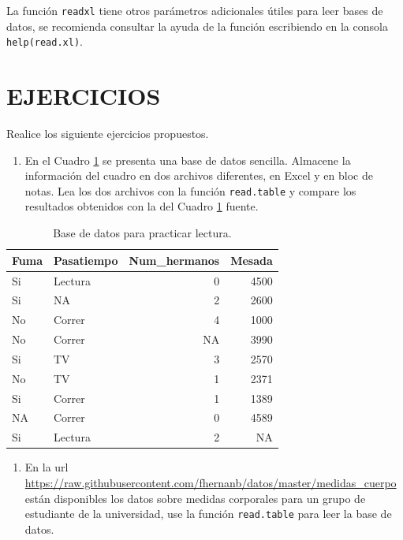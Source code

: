 \documentclass[10pt,]{krantz}
\providecommand{\tightlist}{%
  \setlength{\itemsep}{0pt}\setlength{\parskip}{0pt}}
\begin{document}
La función \texttt{readxl} tiene otros parámetros adicionales útiles
para leer bases de datos, se recomienda consultar la ayuda de la función
escribiendo en la consola \texttt{help(read.xl)}.

\section*{EJERCICIOS}\label{ejercicios-3}


Realice los siguiente ejercicios propuestos.

\begin{enumerate}
\def\labelenumi{\arabic{enumi}.}
\tightlist
\item
  En el Cuadro \ref{tab:toy} se presenta una base de datos sencilla.
  Almacene la información del cuadro en dos archivos diferentes, en
  Excel y en bloc de notas. Lea los dos archivos con la función
  \texttt{read.table} y compare los resultados obtenidos con la del
  Cuadro \ref{tab:toy} fuente.
\end{enumerate}

\begin{table}

\caption{\label{tab:toy}Base de datos para practicar lectura.}
\centering
\begin{tabular}[t]{llrr}
\toprule
Fuma & Pasatiempo & Num\_hermanos & Mesada\\
\midrule
Si & Lectura & 0 & 4500\\
Si & NA & 2 & 2600\\
No & Correr & 4 & 1000\\
No & Correr & NA & 3990\\
Si & TV & 3 & 2570\\
\addlinespace
No & TV & 1 & 2371\\
Si & Correr & 1 & 1389\\
NA & Correr & 0 & 4589\\
Si & Lectura & 2 & NA\\
\bottomrule
\end{tabular}
\end{table}

\begin{enumerate}
\def\labelenumi{\arabic{enumi}.}
\setcounter{enumi}{1}
\tightlist
\item
  En la url
  \url{https://raw.githubusercontent.com/fhernanb/datos/master/medidas_cuerpo}
  están disponibles los datos sobre medidas corporales para un grupo de
  estudiante de la universidad, use la función \texttt{read.table} para
  leer la base de datos.
\end{enumerate}
\end{document}
